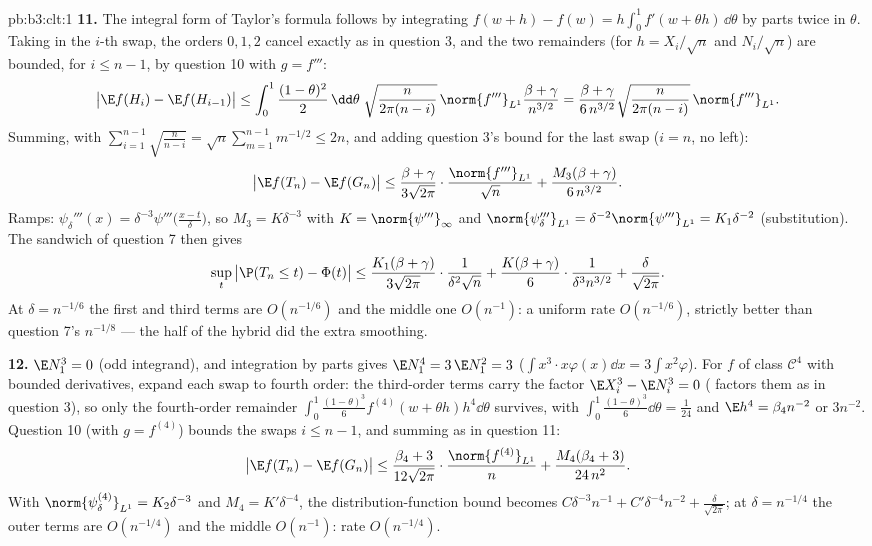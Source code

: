 \begin{solution}{pb:b3:clt:1}
\textbf{11.} The integral form of Taylor's formula follows
by integrating $f(w + h) - f(w) =
h\int_0^1f'(w + \theta h)\,\dd\theta$ by parts twice in
$\theta$. Taking  in the $i$-th swap, the
orders $0, 1, 2$ cancel exactly as in question 3, and the
two remainders (for $h = X_i/\sqrt n$
and $N_i/\sqrt n$) are bounded, for $i \leq n - 1$, by
question 10 with $g = f'''$:
\[
\bigl|\E f(H_i) - \E f(H_{i-1})\bigr| \leq
\int_0^1\frac{(1-\theta)^2}2\,\dd\theta\;
\sqrt{\frac{n}{2\pi(n-i)}}\,\norm{f'''}_{L^1}
\frac{\beta + \gamma}{n^{3/2}}
= \frac{\beta + \gamma}{6\,n^{3/2}}
\sqrt{\frac{n}{2\pi(n-i)}}\,\norm{f'''}_{L^1} .
\]
Summing, with $\sum_{i=1}^{n-1}\sqrt{\frac n{n-i}} =
\sqrt n\sum_{m=1}^{n-1}m^{-1/2} \leq 2n$, and adding
question 3's bound for the last swap ($i = n$, no 
left):
\[
\bigl|\E f(T_n) - \E f(G_n)\bigr| \leq
\frac{\beta + \gamma}{3\sqrt{2\pi}}\cdot
\frac{\norm{f'''}_{L^1}}{\sqrt n} +
\frac{M_3(\beta + \gamma)}{6\,n^{3/2}} .
\]
Ramps: $\psi_\delta'''(x) =
\delta^{-3}\psi'''\bigl(\frac{x - t}\delta\bigr)$, so
$M_3 = K\delta^{-3}$ with $K = \norm{\psi'''}_\infty$ and
$\norm{\psi_\delta'''}_{L^1} = \delta^{-2}
\norm{\psi'''}_{L^1} = K_1\delta^{-2}$ (substitution). The
sandwich of question 7 then gives
\[
\sup_t\,\bigl|\P(T_n \leq t) - \Phi(t)\bigr| \leq
\frac{K_1(\beta + \gamma)}{3\sqrt{2\pi}}\cdot
\frac1{\delta^2\sqrt n} +
\frac{K(\beta + \gamma)}{6}\cdot
\frac1{\delta^3n^{3/2}} + \frac\delta{\sqrt{2\pi}} .
\]
At $\delta = n^{-1/6}$ the first and third terms are
$O(n^{-1/6})$ and the middle one $O(n^{-1})$: a uniform
rate $O(n^{-1/6})$, strictly better than question 7's
$n^{-1/8}$ --- the  half of the hybrid did the
extra smoothing.

\textbf{12.} $\E N_1^3 = 0$ (odd integrand), and
integration by parts gives $\E N_1^4 = 3\,\E N_1^2 = 3$
($\int x^3\cdot x\varphi(x)\dd x =
3\int x^2\varphi$). For $f$ of class $\mathcal C^4$ with
bounded derivatives, expand each swap to fourth order: the
third-order terms carry the factor $\E X_i^3 - \E N_i^3 =
0$ ( factors them as in question 3), so only
the fourth-order remainder
$\int_0^1\frac{(1-\theta)^3}6f^{(4)}(w + \theta
h)h^4\dd\theta$ survives, with $\int_0^1
\frac{(1-\theta)^3}6\dd\theta = \frac1{24}$ and $\E h^4 =
\beta_4n^{-2}$ or $3n^{-2}$. Question 10 (with $g =
f^{(4)}$) bounds the swaps $i \leq n - 1$, and summing as
in question 11:
\[
\bigl|\E f(T_n) - \E f(G_n)\bigr| \leq
\frac{\beta_4 + 3}{12\sqrt{2\pi}}\cdot
\frac{\norm{f^{(4)}}_{L^1}}{n} +
\frac{M_4(\beta_4 + 3)}{24\,n^2} .
\]
With $\norm{\psi_\delta^{(4)}}_{L^1} = K_2\delta^{-3}$ and
$M_4 = K'\delta^{-4}$, the distribution-function bound
becomes $C\delta^{-3}n^{-1} + C'\delta^{-4}n^{-2} +
\frac\delta{\sqrt{2\pi}}$; at $\delta = n^{-1/4}$ the
outer terms are $O(n^{-1/4})$ and the middle $O(n^{-1})$:
rate $O(n^{-1/4})$.


\end{solution}
